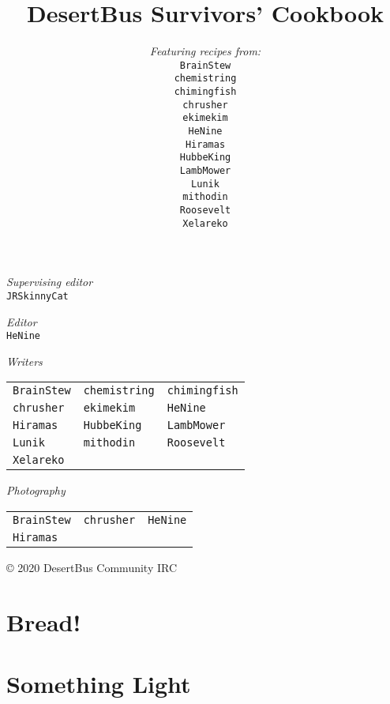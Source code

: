 \documentclass[12pt,a4paper,twoside]{book}
\title{DesertBus Survivors' Cookbook}
\author{\textit{Featuring recipes from:}\\
		\texttt{BrainStew}\\%
		\texttt{chemistring}\\%
		\texttt{chimingfish}\\%
		\texttt{chrusher}\\%
		\texttt{ekimekim}\\%
		\texttt{HeNine}\\%
		\texttt{Hiramas}\\%
		\texttt{HubbeKing}\\%
		\texttt{LambMower}\\%
		\texttt{Lunik}\\%
		\texttt{mithodin}\\%
		\texttt{Roosevelt}\\%
		\texttt{Xelareko}
}
\begin{document}
	\maketitle


	\null
	\vfill

	\textit{Supervising editor}\\
	\texttt{JRSkinnyCat}

	\textit{Editor}\\
	\texttt{HeNine}


	\textit{Writers}\\
	\hspace*{-0.45em}\begin{tabular}{lll}
	\texttt{BrainStew} &
	\texttt{chemistring} &
	\texttt{chimingfish}\\
	\texttt{chrusher} &
	\texttt{ekimekim} &
	\texttt{HeNine}\\
	\texttt{Hiramas} &
	\texttt{HubbeKing} &
	\texttt{LambMower}\\
	\texttt{Lunik} &
	\texttt{mithodin} &
	\texttt{Roosevelt}\\
	\texttt{Xelareko}&&
	\end{tabular}

	\textit{Photography}\\
	\hspace*{-0.45em}\begin{tabular}{lll}
		\texttt{BrainStew} &
		\texttt{chrusher} &
		\texttt{HeNine}\\
		\texttt{Hiramas}&&
	\end{tabular}

	\vspace{1in}
	© 2020 DesertBus Community IRC

	\tableofcontents
	\clearpage

	\chapter{Bread!}
	\clearpage

	
	\clearpage
	
	\clearpage
	
	\clearpage

	\chapter{Something Light}
	\clearpage

	
	\clearpage
	
	\clearpage
	
	\clearpage
\end{document}
